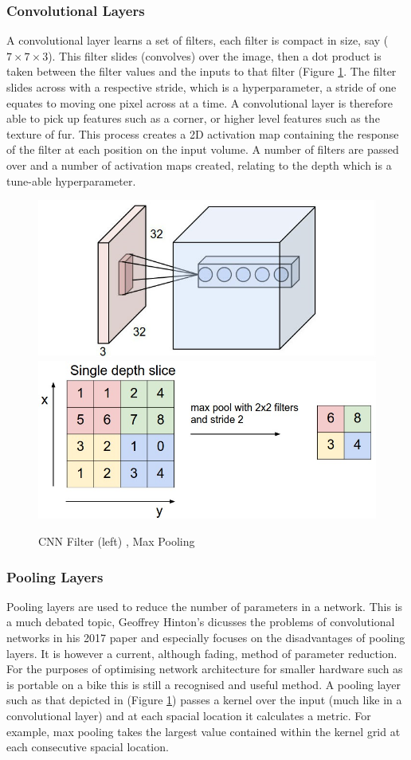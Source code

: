 \documentclass[a4paper,11pt,notitlepage]{article}
\begin{document}
\subsubsection{Convolutional Layers}
A convolutional layer learns a set of filters, each filter is compact in size, say ($7 \times 7 \times 3$). This filter slides (convolves) over the image, then a dot product is taken between the filter values and the inputs to that filter (Figure \ref{CNN_filter}. The filter slides across with a respective stride, which is a hyperparameter, a stride of one equates to moving one pixel across at a time. A convolutional layer is therefore able to pick up features such as a corner, or higher level features such as the texture of fur. This process creates a 2D activation map containing the response of the filter at each position on the input volume. A number of filters are passed over and a number of activation maps created, relating to the depth which is a tune-able hyperparameter.

\noindent \begin{figure}[h!]
\includegraphics[width = 0.5\hsize]{./figures/conv_filter.jpg}
\includegraphics[width = 0.5\hsize]{./figures/maxpool.jpeg}
\caption{CNN Filter (left) \cite{StanfordCS231_conv_filter}, Max Pooling \cite{StanfordCS231_max_pool}}
\label{CNN_filter}
\end{figure}

\subsubsection{Pooling Layers}
Pooling layers are used to reduce the number of parameters in a network. This is a much debated topic, Geoffrey Hinton's \cite{DBLP:journals/corr/abs-1710-09829} dicusses the problems of convolutional networks in his 2017 paper and especially focuses on the disadvantages of pooling layers. It is however a current, although fading, method of parameter reduction. For the purposes of optimising network architecture for smaller hardware such as is portable on a bike this is still a recognised and useful method.
\newline \newline
A pooling layer such as that depicted in (Figure \ref{CNN_filter}) passes a kernel over the input (much like in a convolutional layer) and at each spacial location it calculates a metric. For example, max pooling takes the largest value contained within the kernel grid at each consecutive spacial location.
\end{document}
